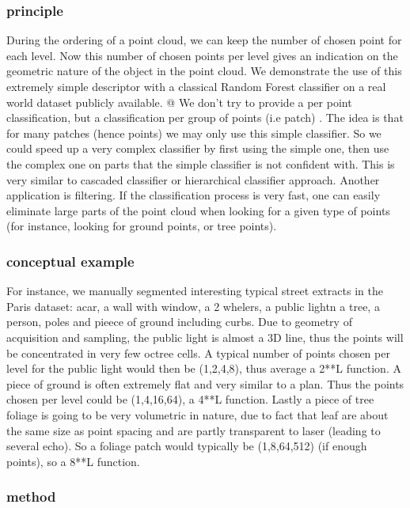 		\subsubsection{principle}
			During the ordering of a point cloud, we can keep the number of chosen point for each level.
			Now this number of chosen points per level gives an indication on the geometric nature of the object in the point cloud. 
			We demonstrate the use of this extremely simple descriptor with a classical Random Forest classifier on a real world dataset publicly available.
			@
			We don't try to provide a per point classification, but a classification per group of points (i.e patch) . 
			The idea is that for many patches (hence points) we may only use this simple classifier. So we could speed up a very complex classifier by first using the simple one, then use the complex one on parts that the simple classifier is not confident with.
			This is very similar to cascaded classifier or hierarchical classifier approach.
			Another application is filtering. If the classification process is very fast, one can easily eliminate large parts of the point cloud when looking for a given type of points (for instance, looking for ground points, or tree points).
		\subsubsection{conceptual example}
			 
			For instance, we manually segmented interesting typical street extracts in the Paris dataset: acar, a wall with window, a 2 whelers, a public lightn a tree, a person, poles and pieece of ground including curbs.
			Due to geometry of acquisition and sampling, the public light is almost a 3D line, thus the points will be concentrated in very few octree cells.
			A typical number of points chosen per level  for the public light would then be (1,2,4,8), thus average a 2**L function.
			A piece of ground is often extremely flat and very similar to a plan.
			Thus the points chosen per level could be (1,4,16,64), a 4**L function.
			Lastly a piece of tree foliage is going to be very volumetric in nature, due to fact that leaf are about the same size as point spacing and are partly transparent to laser (leading to several echo).
			So a foliage patch would typically be (1,8,64,512) (if enough points), so a 8**L function.
			
		\subsubsection{method}

